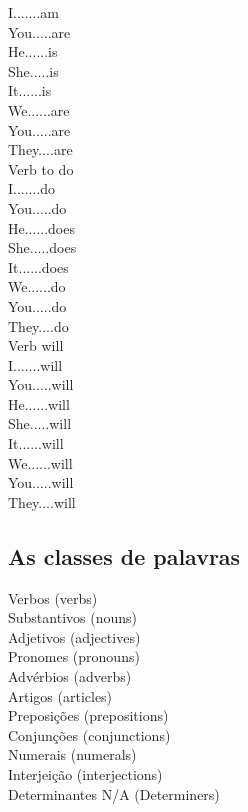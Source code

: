\documentclass[12pt,a4paper]{article} %
\begin{document}
		I.......am\\
		
		You.....are\\
		
		He......is\\
		She.....is\\
		It......is\\
		
		We......are\\
		
		You.....are\\
		
		They....are\\

	Verb to do\\

		I.......do\\
		
		You.....do\\
		
		He......does\\
		She.....does\\
		It......does\\
		
		We......do\\
		
		You.....do\\
		
		They....do\\
		
	Verb will\\
		
		I.......will\\
		
		You.....will\\
		
		He......will\\
		She.....will\\
		It......will\\
		
		We......will\\
		
		You.....will\\
		
		They....will\\




\subsection{As classes de palavras}

	Verbos (verbs)\\
	Substantivos (nouns)\\
	Adjetivos (adjectives)\\
	Pronomes (pronouns)\\
	Advérbios (adverbs)\\
	Artigos (articles)\\
	Preposições (prepositions)\\
	Conjunções (conjunctions)\\
	Numerais (numerals)\\
	Interjeição (interjections)\\
	Determinantes N/A (Determiners)\\
\end{document}
